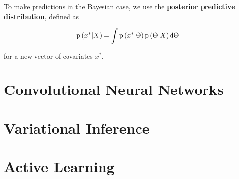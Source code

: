 To make predictions in the Bayesian case, we use the \textbf{posterior predictive distribution}, defined as

$$
  \mathrm{p}\left( x^* | X \right) = \int \mathrm{p}\left( x^* | \Theta \right) \mathrm{p}\left( \Theta | X \right) \mathrm{d}\Theta
$$

for a new vector of covariates $x^*$.



\section{Convolutional Neural Networks}



\section{Variational Inference}



\section{Active Learning}
